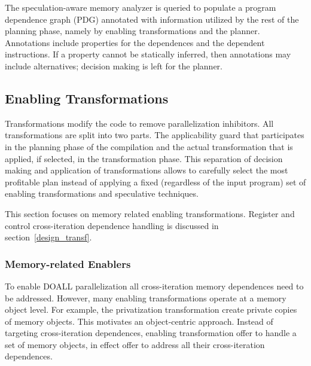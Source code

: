 The speculation-aware memory analyzer is queried to populate a program
dependence graph (PDG) annotated with information utilized by the rest
of the planning phase, namely by enabling transformations and the
planner. Annotations include properties for the dependences and the
dependent instructions.
If a property cannot be statically inferred, then annotations may
include alternatives; decision making is left for the planner.


\subsection{Enabling Transformations}
\label{enablers}

Transformations modify the code to remove parallelization inhibitors.
%
All transformations are split into two parts. The applicability guard
that participates in the planning phase of the compilation and the
actual transformation that is applied, if selected, in the
transformation phase.
This separation of decision making and application of transformations
allows \name to carefully select the most profitable plan instead of
applying a fixed (regardless of the input program) set of enabling
transformations and speculative techniques.

%
This section focuses on memory related enabling transformations.
Register and control cross-iteration dependence handling is discussed
in section~\ref{design_transf}.

\subsubsection*{Memory-related Enablers}

To enable DOALL parallelization all cross-iteration memory dependences
need to be addressed.  However, many enabling transformations operate
at a memory object level. For example, the privatization
transformation create private copies of memory objects. This motivates
an object-centric approach.  Instead of targeting cross-iteration
dependences, enabling transformation offer to handle a set of memory
objects, in effect offer to address all their cross-iteration
dependences.

